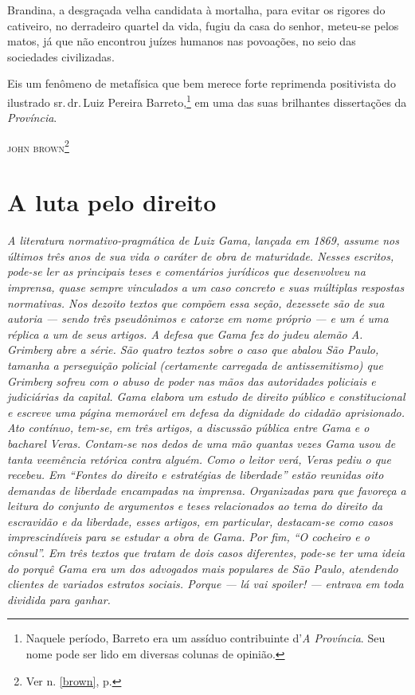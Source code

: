 Brandina, a desgraçada velha candidata à mortalha, para evitar os
rigores do cativeiro, no derradeiro quartel da vida, fugiu da casa do
senhor, meteu-se pelos matos, já que não encontrou juízes humanos nas
povoações, no seio das sociedades civilizadas.

Eis um fenômeno de metafísica que bem merece forte reprimenda
positivista do ilustrado sr.\,dr.\,Luiz Pereira Barreto,\footnote{Naquele
  período, Barreto era um assíduo contribuinte d'\emph{A Província}. Seu
  nome pode ser lido em diversas colunas de opinião.} em uma das suas
brilhantes dissertações da \emph{Província}.\medskip
{}

\hfill\textsc{john brown}\footnote{Ver n. \ref{brown}, p. \pageref{brown}}

\part{A luta pelo direito} %


\begin{didas}
\emph{A literatura normativo-pragmática de Luiz Gama, lançada em 1869,
assume nos últimos três anos de sua vida o caráter de obra de
maturidade. Nesses escritos, pode-se ler as principais teses e
comentários jurídicos que desenvolveu na imprensa, quase sempre
vinculados a um caso concreto e suas múltiplas respostas normativas. Nos
dezoito textos que compõem essa seção, dezessete são de sua autoria ---
sendo três pseudônimos e catorze em nome próprio --- e um é uma réplica a
um de seus artigos. A defesa que Gama fez do judeu alemão A. Grimberg
abre a série. São quatro textos sobre o caso que abalou São Paulo,
tamanha a perseguição policial (certamente carregada de antissemitismo)
que Grimberg sofreu com o abuso de poder nas mãos das autoridades
policiais e judiciárias da capital. Gama elabora um estudo de direito
público e constitucional e escreve uma página memorável em defesa da
dignidade do cidadão aprisionado. Ato contínuo, tem-se, em três artigos,
a discussão pública entre Gama e o bacharel Veras. Contam-se nos dedos
de uma mão quantas vezes Gama usou de tanta veemência retórica contra
alguém. Como o leitor verá, Veras pediu o que recebeu. Em ``Fontes do
direito e estratégias de liberdade'' estão reunidas oito demandas
de liberdade encampadas na imprensa. Organizadas para que favoreça a
leitura do conjunto de argumentos e teses relacionados ao tema do
direito da escravidão e da liberdade, esses artigos, em particular,
destacam-se como casos imprescindíveis para se estudar a obra de Gama.
Por fim, ``O cocheiro e o cônsul''. Em três textos que tratam de
dois casos diferentes, pode-se ter uma ideia do porquê Gama era um dos
advogados mais populares de São Paulo, atendendo clientes de variados
estratos sociais. Porque --- lá vai spoiler! --- entrava em toda dividida
para ganhar.}
\end{didas}

